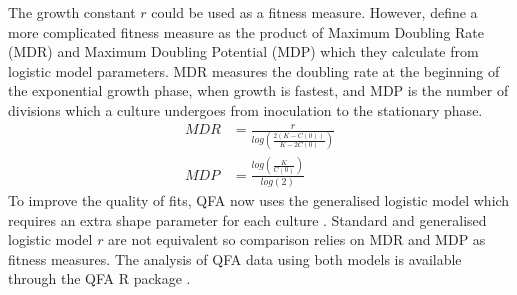 The growth constant \(r\) could be used as a fitness measure. However,
\citet{Addinall2011} define a more complicated fitness measure as the
product of Maximum Doubling Rate (MDR) and Maximum Doubling Potential
(MDP) which they calculate from logistic model parameters. MDR measures
the doubling rate at the beginning of the exponential growth phase,
when growth is fastest, and MDP is the number of divisions which a
culture undergoes from inoculation to the stationary phase.
%
\begin{subequations}
  \label{eq:MDR_MDP}
    \begin{align}
      MDR &= \frac{r}{log\left(\frac{2(K-C(0))}{K-2C(0)}\right)}\\
      MDP &= \frac{log\left(\frac{K}{C(0)}\right)}{log(2)}
    \end{align}
\end{subequations}
%
To improve the quality of fits, QFA now uses the generalised logistic
model which requires an extra shape parameter for each culture
\citep{Banks2012}. Standard and generalised logistic model \(r\) are
not equivalent so comparison relies on MDR and MDP as fitness
measures. The analysis of QFA data using both models is available
through the QFA R package \citep{qfa2016}.



